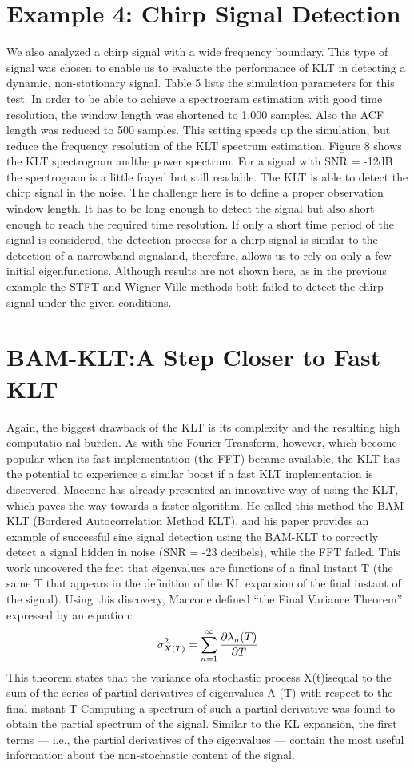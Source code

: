 \documentclass[12pt]{report}
\begin{document}
\section*{Example 4: Chirp Signal Detection}
We also analyzed a chirp signal with a wide frequency boundary. This type of
signal was chosen to enable us to evaluate the performance of KLT in detecting
a dynamic, non-stationary signal. Table 5 lists the simulation parameters for this test.
In order to be able to achieve a spectrogram estimation with good time resolution, the window length was shortened to 1,000 samples. Also the ACF length was reduced to 500 samples. This setting speeds up the simulation, but reduce the frequency resolution of the KLT spectrum estimation.
Figure 8 shows the KLT spectrogram andthe power spectrum. For a signal with SNR = -12dB the spectrogram is a little frayed but still readable. The KLT is able to detect the chirp signal in the noise.
The challenge here is to define a proper observation window length. It has to be long enough to detect the signal but also short enough to reach the required time resolution. If only a short time period of the signal is considered, the detection process for a chirp signal is similar to the detection of a narrowband signaland, therefore, allows us to rely on only a few initial eigenfunctions.
Although results are not shown here, as in the previous example the STFT and Wigner-Ville methods both failed to detect the chirp signal under the given conditions.
\section*{BAM-KLT:\@ A Step Closer to Fast KLT}
Again, the biggest drawback of the KLT is its complexity and the resulting high computatio-nal burden. As with the Fourier Transform, however, which become popular when its fast implementation (the FFT) became available, the KLT has the potential to experience a similar boost if a fast KLT implementation is discovered.
Maccone has already presented an innovative way of using the KLT, which paves the way towards a faster algorithm. He called this method the BAM-KLT (Bordered Autocorrelation Method KLT), and his paper provides an example of successful sine signal detection using the BAM-KLT to correctly detect a signal hidden in noise (SNR = -23 decibels), while the FFT failed.
This work uncovered the fact that eigenvalues are functions of a final instant T (the same T that appears in the definition of the KL expansion of the final instant of the signal). Using this discovery, Maccone defined “the Final Variance Theorem” expressed by an equation:
\begin{equation}
	\sigma_{X(T)}^2=\sum_{n=1}^{\infty}\pdv{\lambda_n(T)}{T}
	\label{eq:8}
\end{equation}
This theorem states that the variance ofa stochastic process X(t)isequal to the sum of the series of partial derivatives of eigenvalues A (T) with respect to the final instant T Computing a spectrum of such a partial derivative was found to obtain the partial spectrum of the signal. Similar to the KL expansion, the first terms — i.e., the partial derivatives of the eigenvalues — contain the most useful information about the non-stochastic content of the signal.
\end{document}
